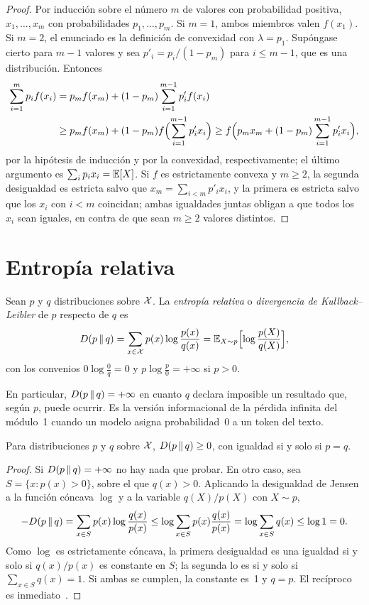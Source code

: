 \begin{proof}
Por inducción sobre el número $m$ de valores con probabilidad positiva, $x_1,\dots,x_m$ con probabilidades $p_1,\dots,p_m$. Si $m=1$, ambos miembros valen $f(x_1)$. Si $m=2$, el enunciado es la definición de convexidad con $\lambda=p_1$. Supóngase cierto para $m-1$ valores y sea $p'_i=p_i/(1-p_m)$ para $i\le m-1$, que es una distribución. Entonces
\begin{align*}
\sum_{i=1}^{m}p_if(x_i)&=p_mf(x_m)+(1-p_m)\sum_{i=1}^{m-1}p'_if(x_i)\\
&\ge p_mf(x_m)+(1-p_m)f\Bigl(\sum_{i=1}^{m-1}p'_ix_i\Bigr)
\ge f\Bigl(p_mx_m+(1-p_m)\sum_{i=1}^{m-1}p'_ix_i\Bigr),
\end{align*}
por la hipótesis de inducción y por la convexidad, respectivamente; el último argumento es $\sum_i p_ix_i=\mathbb{E}[X]$. Si $f$ es estrictamente convexa y $m\ge 2$, la segunda desigualdad es estricta salvo que $x_m=\sum_{i<m}p'_ix_i$, y la primera es estricta salvo que los $x_i$ con $i<m$ coincidan; ambas igualdades juntas obligan a que todos los $x_i$ sean iguales, en contra de que sean $m\ge 2$ valores distintos.
\end{proof}

\section{Entropía relativa}

\begin{definicion}\label{def:kl}
Sean $p$ y $q$ distribuciones sobre $\mathcal{X}$. La \emph{entropía relativa} o \emph{divergencia de Kullback--Leibler} de $p$ respecto de $q$ es
\[
D(p\,\|\,q)=\sum_{x\in\mathcal{X}}p(x)\log\frac{p(x)}{q(x)}=\mathbb{E}_{X\sim p}\Bigl[\log\frac{p(X)}{q(X)}\Bigr],
\]
con los convenios $0\log\frac{0}{q}=0$ y $p\log\frac{p}{0}=+\infty$ si $p>0$.
\end{definicion}

En particular, $D(p\,\|\,q)=+\infty$ en cuanto $q$ declara imposible un resultado que, según $p$, puede ocurrir. Es la versión informacional de la pérdida infinita del módulo~1 cuando un modelo asigna probabilidad~0 a un token del texto.

\begin{teorema}\label{teo:gibbs}
Para distribuciones $p$ y $q$ sobre $\mathcal{X}$, $D(p\,\|\,q)\ge 0$, con igualdad si y solo si $p=q$.
\end{teorema}

\begin{proof}
Si $D(p\,\|\,q)=+\infty$ no hay nada que probar. En otro caso, sea $S=\{x:p(x)>0\}$, sobre el que $q(x)>0$. Aplicando la desigualdad de Jensen a la función cóncava $\log$ y a la variable $q(X)/p(X)$ con $X\sim p$,
\[
-D(p\,\|\,q)=\sum_{x\in S}p(x)\log\frac{q(x)}{p(x)}\le\log\sum_{x\in S}p(x)\frac{q(x)}{p(x)}=\log\sum_{x\in S}q(x)\le\log 1=0.
\]
Como $\log$ es estrictamente cóncava, la primera desigualdad es una igualdad si y solo si $q(x)/p(x)$ es constante en $S$; la segunda lo es si y solo si $\sum_{x\in S}q(x)=1$. Si ambas se cumplen, la constante es~1 y $q=p$. El recíproco es inmediato~\cite[teorema~2.6.3]{ct}.
\end{proof}

